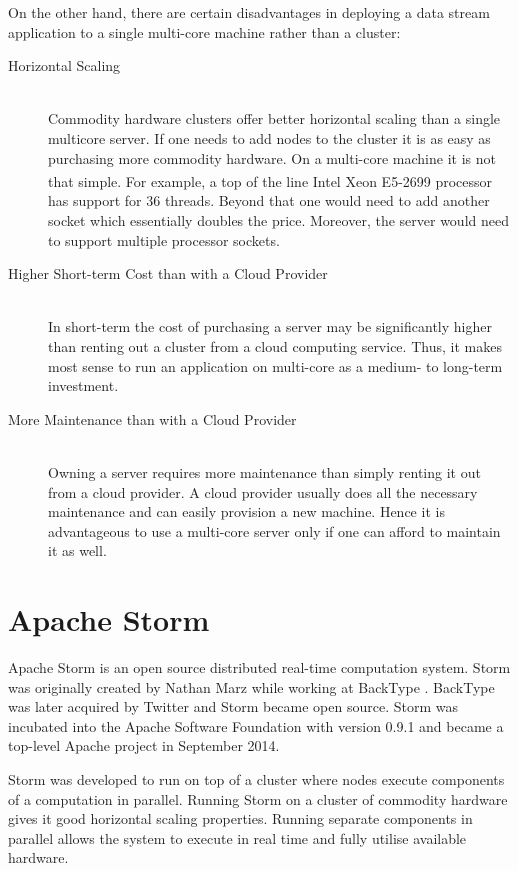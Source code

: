 \documentclass[bsc,twoside,singlespacing,normalheadings,parskip]{infthesis}\usepackage[]{graphicx}\usepackage[]{color}
\begin{document}
On the other hand, there are certain disadvantages in deploying a data stream application to a single multi-core machine rather than a cluster:

\begin{description}
	\item[Horizontal Scaling] \hfill \\
	Commodity hardware clusters offer better horizontal scaling than a single multicore server. If one needs to add nodes to the cluster it is as easy as purchasing more commodity hardware. On a multi-core machine it is not that simple. For example, a top of the line Intel\textsuperscript{\textregistered} Xeon\textsuperscript{\textregistered} E5-2699 processor has support for 36 threads. Beyond that one would need to add another socket which essentially doubles the price. Moreover, the server would need to support multiple processor sockets.
	\item[Higher Short-term Cost than with a Cloud Provider] \hfill \\
	In short-term the cost of purchasing a server may be significantly higher than renting out a cluster from a cloud computing service. Thus, it makes most sense to run an application on multi-core as a medium- to long-term investment.
	\item[More Maintenance than with a Cloud Provider] \hfill \\
	Owning a server requires more maintenance than simply renting it out from a cloud provider. A cloud provider usually does  all the necessary maintenance and can easily provision a new machine. Hence it is advantageous to use a multi-core server only if one can afford to maintain it as well.
\end{description}

\section{Apache Storm}
\label{sec:apache_storm}

Apache Storm is an open source distributed real-time computation system. Storm was originally created by Nathan Marz while working at BackType \cite{NathanAbout}. BackType was later acquired by Twitter and Storm became open source. Storm was incubated into the Apache Software Foundation with version 0.9.1 and became a top-level Apache project in September 2014.

Storm was developed to run on top of a cluster where nodes execute components of a computation in parallel. Running Storm on a cluster of commodity hardware gives it good horizontal scaling properties. Running separate components in parallel allows the system to execute in real time and fully utilise available hardware.
\end{document}
